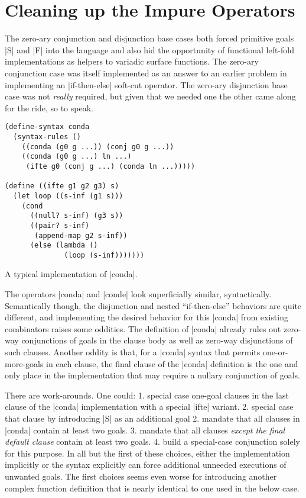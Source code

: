 \documentclass[sigplan,screen,draft,anonymous,review,natbib=false]{acmart}
\begin{document}
\section{Cleaning up the Impure Operators}\label{sec:impure}

The zero-ary conjunction and disjunction base cases both forced
primitive goals \rackinline|S| and \rackinline|F| into the language
and also hid the opportunity of functional left-fold implementations
as helpers to variadic surface functions. The zero-ary conjunction
case was itself implemented as an answer to an earlier problem in
implementing an \rackinline|if-then-else| soft-cut operator. The
zero-ary disjunction base case was not \emph{really} required, but
given that we needed one the other came along for the ride, so to
speak.

\begin{listing}
  \begin{verbatim}
(define-syntax conda
  (syntax-rules ()
    ((conda (g0 g ...)) (conj g0 g ...))
    ((conda (g0 g ...) ln ...)
     (ifte g0 (conj g ...) (conda ln ...)))))

(define ((ifte g1 g2 g3) s)
  (let loop ((s-inf (g1 s)))
    (cond
      ((null? s-inf) (g3 s))
      ((pair? s-inf)
       (append-map g2 s-inf))
      (else (lambda ()
              (loop (s-inf)))))))
  \end{verbatim}
  \caption{A typical implementation of \rackinline|conda|.}
  \label{mnt:conda-implementation}
\end{listing}

The operators \rackinline|conda| and \rackinline|conde| look
superficially similar, syntactically. Semantically though, the
disjunction and nested \enquote{if-then-else} behaviors are quite
different, and implementing the desired behavior for this
\rackinline|conda| from existing combinators raises some oddities. The
definition of \rackinline|conda| already rules out zero-way
conjunctions of goals in the clause body as well as zero-way
disjunctions of such clauses. Another oddity is that, for a
\rackinline|conda| syntax that permits one-or-more-goals in each
clause, the final clause of the \rackinline|conda| definition is the
one and only place in the implementation that may require a nullary
conjunction of goals.

There are work-arounds. One could: 1. special case one-goal clauses in
the last clause of the \rackinline|conda| implementation with a
special \rackinline|ifte| variant. 2. special case that clause by
introducing \rackinline|S| as an additional goal 2. mandate that all
clauses in \rackinline|conda| contain at least two goals. 3. mandate
that all clauses \emph{except the final default clause} contain at
least two goals. 4. build a special-case conjunction solely for this
purpose. In all but the first of these choices, either the
implementation implicitly or the syntax explicitly can force
additional unneeded executions of unwanted goals. The first choices
seems even worse for introducing another complex function definition
that is nearly identical to one used in the below case.
\end{document}
